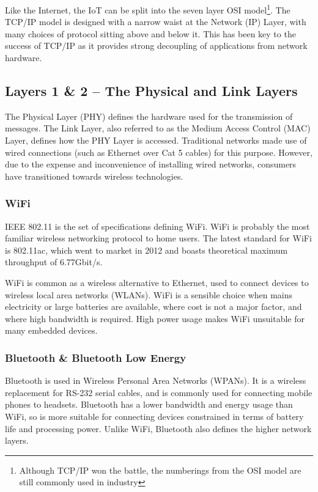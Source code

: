 \documentclass[10pt,journal,compsoc]{IEEEtran}
\begin{document}
Like the Internet, the IoT can be split into the seven layer OSI
model\footnote{Although TCP/IP won the battle, the numberings from the OSI
model are still commonly used in industry}. The TCP/IP model is designed with a
narrow waist at the Network (IP) Layer, with many choices of protocol sitting
above and below it. This has been key to the success of TCP/IP as it
provides strong decoupling of applications from network hardware.

\subsection{Layers 1 \& 2 -- The Physical and Link Layers}
\label{layer_1_2}
The Physical Layer (PHY) defines the hardware used for the transmission of
messages. The Link Layer, also referred to as the Medium Access Control (MAC)
Layer, defines how the PHY Layer is accessed. Traditional networks made use of
wired connections (such as Ethernet over Cat 5 cables) for this purpose.
However, due to the expense and inconvenience of installing wired networks,
consumers have transitioned towards wireless technologies. 

\subsubsection{WiFi}
IEEE 802.11 is the set of specifications defining WiFi. WiFi is probably the
most familiar wireless networking protocol to home users. The latest standard
for WiFi is 802.11ac, which went to market in 2012 and boasts theoretical
maximum throughput of 6.77Gbit/s. 

WiFi is common as a wireless alternative to Ethernet, used to connect devices
to wireless local area networks (WLANs). WiFi is a sensible choice when mains
electricity or large batteries are available, where cost is not a major factor,
and where high bandwidth is required. High power usage makes WiFi unsuitable
for many embedded devices.

\subsubsection{Bluetooth \& Bluetooth Low Energy}
Bluetooth is used in Wireless Personal Area Networks (WPANs). It is a
wireless replacement for RS-232 serial cables, and is commonly used for
connecting mobile phones to headsets. Bluetooth has a lower bandwidth and
energy usage than WiFi, so is more suitable for connecting devices constrained
in terms of battery life and processing power. Unlike WiFi, Bluetooth also
defines the higher network layers. 
\end{document}
